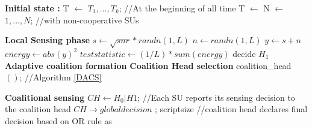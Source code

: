 \documentclass[]{article}
\begin{document}
\begin{algorithm}
	\textbf{Initial state :}\newline
	T $\leftarrow$ ${T_1,...,T_k}$; //At the beginning of all time \newline
	T $\leftarrow$ N $\leftarrow$ ${1, . . . , N}$; //with non-cooperative SUs \newline
	
	\textbf{Local Sensing phase}
	\newline
	$s \leftarrow \sqrt{snr} * randn (1,L)$ \;
	$n \leftarrow randn (1,L)$\;
	$y \leftarrow s + n$ \; 
	$energy \leftarrow abs(y) ^ 2$ \; 
	$test statistic \leftarrow (1/L) * sum(energy)$ \;
	{	
		decide $H_1$ \; 
	}
	\textbf{Adaptive coalition formation}
	\newline	
	\textbf{Coalition Head selection}
	\newline
	coalition\_head $( )$;  //Algorithm \ref{DACS} \newline
	
	\textbf{Coalitional sensing}
	\newline
	$CH \leftarrow  H_0 | H1$; \scriptsize
	//Each SU reports its sensing decision to the coalition head
 \newline
	$CH \rightarrow  global decision$ ; scriptsize //coalition head declares final decision based on OR rule as 
	\caption{Coalition formation for CSS\label{CFCSS}}
\end{algorithm}
\end{document}
